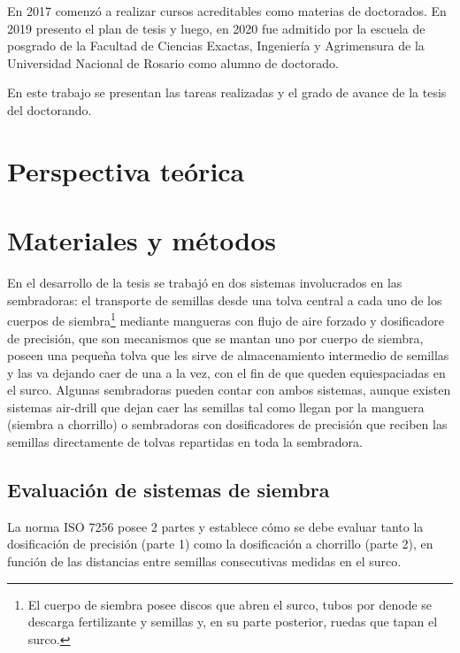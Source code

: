 \documentclass[12pt]{article}
\begin{document}
    En 2017 comenzó a realizar cursos acreditables como materias de doctorados. En 2019 presento el plan de tesis y luego, en 2020 fue admitido por la escuela de posgrado de la Facultad de Ciencias Exactas, Ingeniería y Agrimensura de la Universidad Nacional de Rosario como alumno de doctorado.
    
    En este trabajo se presentan las tareas realizadas y el grado de avance de la tesis del doctorando.
    
    \section{Perspectiva teórica}
    
    
    
    \section{Materiales y métodos}
	
    En el desarrollo de la tesis se trabajó en dos sistemas involucrados en las sembradoras: el transporte de semillas desde una tolva central a cada uno de los cuerpos de siembra\footnote{El cuerpo de siembra posee discos que abren el surco, tubos por denode se descarga fertilizante y semillas y, en su parte posterior, ruedas que tapan el surco.} mediante mangueras con flujo de aire forzado y dosificadore de precisión, que son mecanismos que se mantan uno por cuerpo de siembra, poseen una pequeña tolva que les sirve de almacenamiento intermedio de semillas y las va dejando caer de una a la vez, con el fin de que queden equiespaciadas en el surco. Algunas sembradoras pueden contar con ambos sistemas, aunque existen sistemas air-drill que dejan caer las semillas tal como llegan por la manguera (siembra a chorrillo) o sembradoras con dosificadores de precisión que reciben las semillas directamente de tolvas repartidas en toda la sembradora.
    
	\subsection{Evaluación de sistemas de siembra}
	
	La norma ISO 7256 posee 2 partes y establece cómo se debe evaluar tanto la dosificación de precisión (parte 1) como la dosificación a chorrillo (parte 2), en función de las distancias entre semillas consecutivas medidas en el surco.
	
\end{document}
